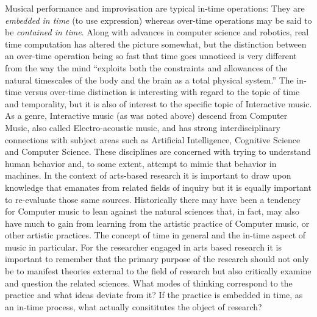 Musical performance and improvisation are typical in-time operations: They are \emph{embedded in time} (to use \citeauthor{smithers96} expression) whereas over-time operations may be said to be \emph{contained in time}. Along with advances in computer science and robotics, real time computation has altered the picture somewhat, but the distinction between an over-time operation being so fast that time goes unnoticed is very different from the way the mind ``exploits both the constraints and allowances of the natural timescales of the body and the brain as a total physical system.'' \parencite[276]{iyer08} The in-time versus over-time distinction is interesting with regard to the topic of time and temporality, but it is also of interest to the specific topic of Interactive music. As a genre, Interactive music (as was noted above) descend from Computer Music, also called Electro-acoustic music, and has strong interdisciplinary connections with subject areas such as Artificial Intelligence, Cognitive Science and Computer Science. \parencite[24]{moore90} These disciplines are concerned with trying to understand human behavior and, to some extent, attempt to mimic that behavior in machines. In the context of arts-based research it is important to draw upon knowledge that emanates from related fields of inquiry but it is equally important to re-evaluate those same sources. Historically there may have been a tendency for Computer music to lean against the natural sciences that, in fact, may also have much to gain from learning from the artistic practice of Computer music, or other artistic practices. The concept of time in general and the in-time aspect of music in particular. For the researcher engaged in arts based research it is important to remember that the primary purpose of the research should not only be to manifest theories external to the field of research but also critically examine and question the related sciences. What modes of thinking correspond to the practice and what ideas deviate from it? If the practice is embedded in time, as an in-time process, what actually consititutes the object of research?

